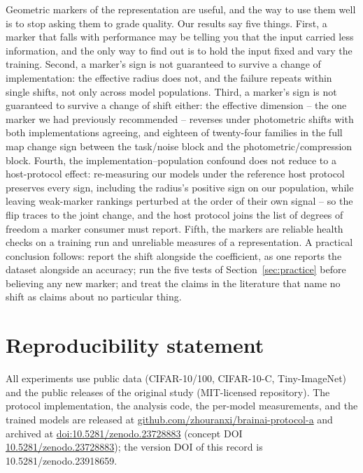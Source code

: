 \documentclass[10pt]{article}
\begin{document}
Geometric markers of the representation are useful, and the way to use them
well is to stop asking them to grade quality. Our results say five things.
First, a marker that falls with performance may be telling you that the input
carried less information, and the only way to find out is to hold the input
fixed and vary the training. Second, a marker's sign is not guaranteed to
survive a change of implementation: the effective radius does not, and the
failure repeats within single shifts, not only across model populations.
Third, a marker's sign is not guaranteed to survive a change of shift either:
the effective dimension -- the one marker we had previously recommended --
reverses under photometric shifts with both implementations agreeing, and
eighteen of twenty-four families in the full map change sign between the
task/noise block and the photometric/compression block. Fourth, the
implementation--population confound does not reduce to a host-protocol
effect: re-measuring our models under the reference host protocol preserves
every sign, including the radius's positive sign on our population, while
leaving weak-marker rankings perturbed at the order of their own signal
-- so the flip traces to the joint change, and the host protocol joins the
list of degrees of freedom a marker consumer must report. Fifth, the markers
are reliable health checks on a training run and unreliable measures of a
representation. A practical conclusion follows: report the shift alongside
the coefficient, as one reports the dataset alongside an accuracy; run the
five tests of Section~\ref{sec:practice} before believing any new marker;
and treat the claims in the literature that name no shift as claims about no
particular thing.

\section*{Reproducibility statement}

\label{sec:repro}

All experiments use public data (CIFAR-10/100, CIFAR-10-C, Tiny-ImageNet) and
the public releases of the original study (MIT-licensed repository). The
protocol implementation, the analysis code, the per-model measurements, and the
trained models are released at
\href{https://github.com/zhouranxi/brainai-protocol-a}{github.com/zhouranxi/brainai-protocol-a}
and archived at \href{https://doi.org/10.5281/zenodo.23728883}{doi:10.5281/zenodo.23728883}
(concept DOI \href{https://doi.org/10.5281/zenodo.23728883}{10.5281/zenodo.23728883});
the version DOI of this record is 10.5281/zenodo.23918659.
\end{document}
